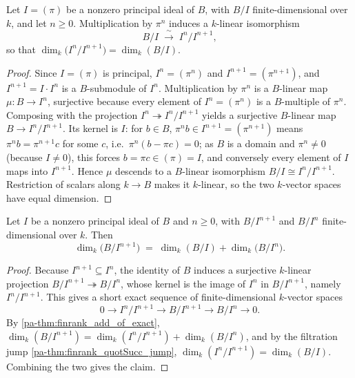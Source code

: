 \begin{theorem}
  \label{pa-thm:finrank_quotSucc_jump}
  \leanok

  Let \(I = (\pi)\) be a nonzero principal ideal of \(B\), with \(B/I\) finite-dimensional over
  \(k\), and let \(n \ge 0\). Multiplication by \(\pi^n\) induces a \(k\)-linear isomorphism
  \[
    B/I \;\xrightarrow{\ \sim\ }\; I^n / I^{n+1} ,
  \]
  so that \(\dim_k\bigl(I^n / I^{n+1}\bigr) = \dim_k(B/I)\).
\end{theorem}
\begin{proof}
  \leanok
  Since \(I = (\pi)\) is principal, \(I^n = (\pi^n)\) and \(I^{n+1} = (\pi^{n+1})\), and
  \(I^{n+1} = I \cdot I^n\) is a \(B\)-submodule of \(I^n\). Multiplication by \(\pi^n\) is a
  \(B\)-linear map \(\mu : B \to I^n\), surjective because every element of \(I^n = (\pi^n)\)
  is a \(B\)-multiple of \(\pi^n\). Composing with the projection \(I^n \twoheadrightarrow
  I^n/I^{n+1}\) yields a surjective \(B\)-linear map \(B \to I^n/I^{n+1}\). Its kernel is
  \(I\): for \(b \in B\), \(\pi^n b \in I^{n+1} = (\pi^{n+1})\) means \(\pi^n b = \pi^{n+1} c\)
  for some \(c\), i.e.\ \(\pi^n(b - \pi c) = 0\); as \(B\) is a domain and \(\pi^n \neq 0\)
  (because \(I \neq 0\)), this forces \(b = \pi c \in (\pi) = I\), and conversely every element
  of \(I\) maps into \(I^{n+1}\). Hence \(\mu\) descends to a \(B\)-linear isomorphism
  \(B/I \cong I^n/I^{n+1}\). Restriction of scalars along \(k \to B\) makes it \(k\)-linear,
  so the two \(k\)-vector spaces have equal dimension.
\end{proof}

\begin{theorem}
  \label{pa-thm:finrank_quotient_pow_succ}
  \leanok

  Let \(I\) be a nonzero principal ideal of \(B\) and \(n \ge 0\), with \(B/I^{n+1}\) and
  \(B/I^n\) finite-dimensional over \(k\). Then
  \[
    \dim_k\bigl(B/I^{n+1}\bigr) \;=\; \dim_k(B/I) + \dim_k\bigl(B/I^n\bigr) .
  \]
\end{theorem}
\begin{proof}
  \leanok
  Because \(I^{n+1} \subseteq I^n\), the identity of \(B\) induces a surjective \(k\)-linear
  projection \(B/I^{n+1} \twoheadrightarrow B/I^n\), whose kernel is the image of \(I^n\) in
  \(B/I^{n+1}\), namely \(I^n/I^{n+1}\). This gives a short exact sequence of
  finite-dimensional \(k\)-vector spaces
  \[
    0 \longrightarrow I^n/I^{n+1} \longrightarrow B/I^{n+1} \longrightarrow B/I^n
      \longrightarrow 0 .
  \]
  By \ref{pa-thm:finrank_add_of_exact}, \(\dim_k(B/I^{n+1}) = \dim_k(I^n/I^{n+1}) +
  \dim_k(B/I^n)\), and by the filtration jump \ref{pa-thm:finrank_quotSucc_jump},
  \(\dim_k(I^n/I^{n+1}) = \dim_k(B/I)\). Combining the two gives the claim.
\end{proof}


